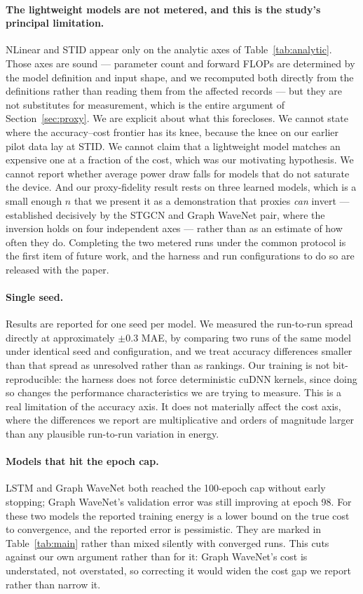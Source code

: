 \documentclass[manuscript,screen,review]{acmart}
\begin{document}
\paragraph{The lightweight models are not metered, and this is the study's
principal limitation.} NLinear and STID appear only on the analytic axes of
Table~\ref{tab:analytic}. Those axes are sound --- parameter count and forward
FLOPs are determined by the model definition and input shape, and we
recomputed both directly from the definitions rather than reading them from
the affected records --- but they are not substitutes for measurement, which
is the entire argument of Section~\ref{sec:proxy}. We are explicit about what
this forecloses. We cannot state where the accuracy--cost frontier has its
knee, because the knee on our earlier pilot data lay at STID. We cannot claim
that a lightweight model matches an expensive one at a fraction of the cost,
which was our motivating hypothesis. We cannot report whether average power
draw falls for models that do not saturate the device. And our proxy-fidelity
result rests on three learned models, which is a small enough $n$ that we
present it as a demonstration that proxies \emph{can} invert --- established
decisively by the STGCN and Graph WaveNet pair, where the inversion holds on
four independent axes --- rather than as an estimate of how often they do.
Completing the two metered runs under the common protocol is the first item of
future work, and the harness and run configurations to do so are released with
the paper.

\paragraph{Single seed.} Results are reported for one seed per model. We
measured the run-to-run spread directly at approximately $\pm0.3$ MAE, by
comparing two runs of the same model under identical seed and configuration,
and we treat accuracy differences smaller than that spread as unresolved
rather than as rankings. Our training is not bit-reproducible: the harness
does not force deterministic cuDNN kernels, since doing so changes the
performance characteristics we are trying to measure. This is a real
limitation of the accuracy axis. It does not materially affect the cost axis,
where the differences we report are multiplicative and orders of magnitude
larger than any plausible run-to-run variation in energy.

\paragraph{Models that hit the epoch cap.} LSTM and Graph WaveNet both reached
the 100-epoch cap without early stopping; Graph WaveNet's validation error was
still improving at epoch 98. For these two models the reported training energy
is a lower bound on the true cost to convergence, and the reported error is
pessimistic. They are marked in Table~\ref{tab:main} rather than mixed
silently with converged runs. This cuts against our own argument rather than
for it: Graph WaveNet's cost is understated, not overstated, so correcting it
would widen the cost gap we report rather than narrow it.
\end{document}
